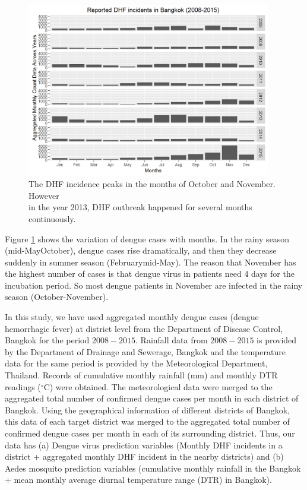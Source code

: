 \documentclass{bmcart}
\begin{document}
\begin{figure}[htbp]
	\begin{center}
		\includegraphics[width= 0.95\textwidth]{5-MonthlyDengueAcrossYears}
		\caption{The DHF incidence peaks in the months of October and November. However \\ in the year 2013, DHF outbreak happened for several months continuously.}
		\label{figure-MonthlyDengueAcrossYears}
	\end{center}
\end{figure}


Figure \ref{figure-MonthlyDengueAcrossYears} %
shows the variation of dengue cases with months. In the rainy season (mid-May\textendash October), dengue cases rise dramatically, and then they decrease suddenly in summer season (February\textemdash mid-May). The reason that November has the highest number of cases is that dengue virus in patients need 4 days for the incubation period. So most dengue patients in November are infected in the rainy season (October-November).  

In this study, we have used aggregated monthly dengue cases (dengue hemorrhagic fever) at district level from the Department of Disease Control, Bangkok for the period $2008-2015$.  Rainfall data from $2008-2015$ is provided by the Department of Drainage and Sewerage, Bangkok and the temperature data for the same period is provided by the Meteorological Department, Thailand. Records of cumulative monthly rainfall (mm) and monthly DTR readings ($^{\circ}$C) were obtained. The meteorological data were merged to the aggregated total number of confirmed dengue cases per month in each district of Bangkok. Using the geographical information of different districts of Bangkok, this data of each target district was merged to the  aggregated total number of confirmed dengue cases per month in each of its surrounding district. Thus, our data has (a) Dengue virus prediction variables (Monthly DHF incidents in a district + aggregated monthly DHF incident in the nearby districts) and (b) Aedes mosquito prediction variables (cumulative monthly rainfall in the Bangkok + mean monthly average diurnal temperature range (DTR) in Bangkok). 
\end{document}
